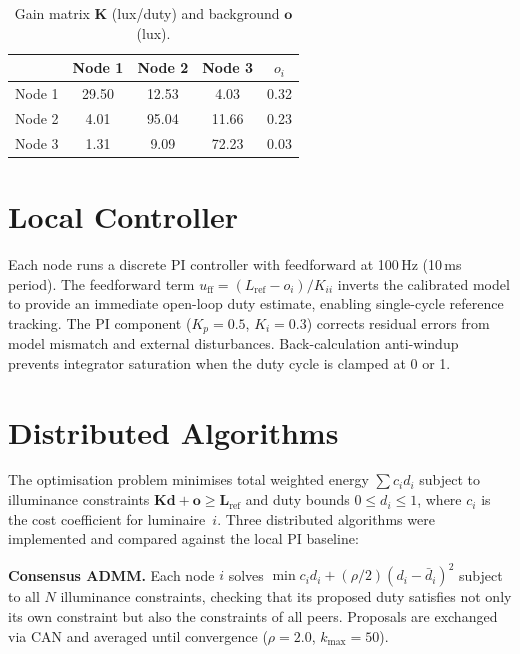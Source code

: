 \documentclass[10pt,twocolumn]{article}
\begin{document}
\begin{table}[H]
\centering
\caption{Gain matrix $\mathbf{K}$ (lux/duty) and background $\mathbf{o}$ (lux).}
\begin{tabular}{c|ccc|c}
\toprule
 & Node 1 & Node 2 & Node 3 & $o_i$ \\
\midrule
Node 1 & 29.50 & 12.53 & 4.03 & 0.32 \\
Node 2 & 4.01 & 95.04 & 11.66 & 0.23 \\
Node 3 & 1.31 & 9.09 & 72.23 & 0.03 \\
\bottomrule
\end{tabular}
\label{tab:K}
\end{table}

\section{Local Controller}

Each node runs a discrete PI controller with feedforward at 100\,Hz (10\,ms period). The feedforward term $u_{\text{ff}} = (L_{\text{ref}} - o_i)/K_{ii}$ inverts the calibrated model to provide an immediate open-loop duty estimate, enabling single-cycle reference tracking. The PI component ($K_p{=}0.5$, $K_i{=}0.3$) corrects residual errors from model mismatch and external disturbances. Back-calculation anti-windup prevents integrator saturation when the duty cycle is clamped at 0 or 1.

\section{Distributed Algorithms}

The optimisation problem minimises total weighted energy $\sum c_i d_i$ subject to illuminance constraints $\mathbf{K}\mathbf{d} + \mathbf{o} \geq \mathbf{L}_{\text{ref}}$ and duty bounds $0 \leq d_i \leq 1$, where $c_i$ is the cost coefficient for luminaire~$i$. Three distributed algorithms were implemented and compared against the local PI baseline:

\textbf{Consensus ADMM.} Each node $i$ solves $\min c_i d_i + (\rho/2)(d_i - \bar{d}_i)^2$ subject to all $N$ illuminance constraints, checking that its proposed duty satisfies not only its own constraint but also the constraints of all peers. Proposals are exchanged via CAN and averaged until convergence ($\rho{=}2.0$, $k_{\max}{=}50$).
\end{document}
